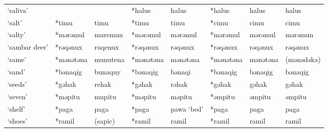 \begin{landscape}
\begin{longtable}[c]{@{}p{3cm}<{\raggedright}p{2.75cm}<{\raggedright}p{2.75cm}<{\raggedright}p{2.75cm}<{\raggedright}p{2.75cm}<{\raggedright}p{2.75cm}<{\raggedright}p{2.75cm}<{\raggedright}p{2.75cm}<{\raggedright}@{}}
`saliva'                                             &                    &                                & *halus             & halus                      & *halus           & halus                    & halus                             \\
`salt'                                               & *timu              & timu                           & *timu              & timu                       & *cimu            & cimu                     & cimu                              \\
`salty'                                              & *mərəmul           & muremun                        & *mərəmul           & mərəmul                    & *mərəmul         & mərəmul                  & mərəmun                           \\
`sambar deer'                                        & *rəqənux           & ruqenux                        & *rəqənux           & rəqənux                    & *rəqənux         & rəqənux                  & rəqənux                           \\
`same'                                               & *mənətəna          & munutena                       & *mənətəna          & mənətəna                   & *mənətəna        & mənətəna                 & (mənədəka)                        \\
`sand'                                               & *bənaqig           & bunaquy                        & *bənaqig           & bənaqi                     & *bənaqig         & bənaqig                  & bənaqig                           \\
`seeds'                                              & *gəhak             & rehak                          & *gəhak             & rəhak                      & *gəhak           & gəhak                    & gəhak                             \\
`seven'                                              & *məpitu            & mupitu                         & *məpitu            & məpitu                     & *əmpitu          & əmpitu                   & əmpitu                            \\
`shelf'                                              & *paga              & paga                           & *paga              & pawa `bed'                 & *paga            & paga                     & paga                              \\
`shoes'                                              & *ramil             & (sapic)                        & *ramil             & ramil                      & *ramil           & ramil                    & ramil                             \\

\end{longtable}
\end{landscape}
